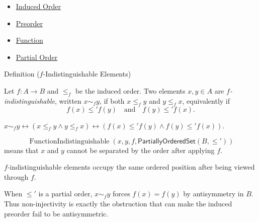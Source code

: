 \begin{dependencies}
\begin{itemize}
  \item \hyperref[def:induced-order]{Induced Order}
  \item \hyperref[def:preorder]{Preorder}
  \item \hyperref[def:function]{Function}
  \item \hyperref[def:partial-order]{Partial Order}
\end{itemize}
\end{dependencies}


\begin{definitionbox}{Definition ($f$-Indistinguishable Elements)}
\begin{definition}\label{def:f-indist}
Let $f : A \to B$ and $\leq_f$ be the induced order. Two elements
$x, y \in A$ are \emph{$f$-indistinguishable}, written $x \sim_f y$,
if both $x \leq_f y$ and $y \leq_f x$, equivalently if
\[
f(x) \leq' f(y) \quad \text{and} \quad f(y) \leq' f(x).
\]
\end{definition}
\end{definitionbox}

\begin{remark*}
$x\sim_f y \leftrightarrow (x\leq_f y \wedge y\leq_f x)
\leftrightarrow (f(x)\leq' f(y)\wedge f(y)\leq' f(x))$.
\end{remark*}

\begin{remark*}
\[
  \operatorname{FunctionIndistinguishable}(x,y,f,\mathsf{PartiallyOrderedSet}(B,\leq'))
\]
means that $x$ and $y$ cannot be separated by the order after applying $f$.
\end{remark*}

\begin{remark*}[Interpretation]
$f$-indistinguishable elements occupy the same ordered position after being
viewed through $f$.
\end{remark*}

\begin{remark*}[Exposition]
When $\leq'$ is a partial order, $x \sim_f y$ forces $f(x)=f(y)$ by
antisymmetry in $B$. Thus non-injectivity is exactly the obstruction that can
make the induced preorder fail to be antisymmetric.
\end{remark*}

